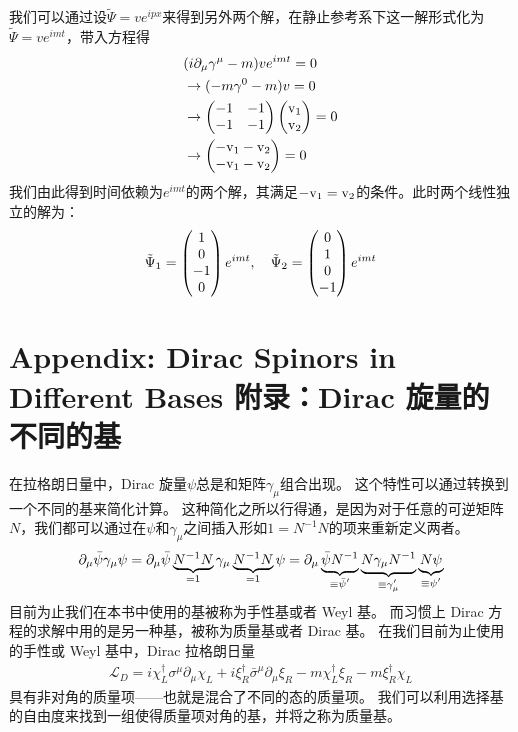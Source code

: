 我们可以通过设$\tilde \Psi =ve^{ipx}$来得到另外两个解，在静止参考系下这一解形式化为$\tilde \Psi=ve^{imt}$，带入方程得
\begin{equation}
\begin{split}
&(i\partial_\mu\gamma^\mu-m)ve^{imt}=0\\
&\to (-m\gamma^0-m)v=0\\
&\to \begin{pmatrix} -1 & -1 \\ -1 & -1 \end{pmatrix} \begin{pmatrix} \rm v_1 \\ \rm v_2 \end{pmatrix} =0\\
&\to \begin{pmatrix} \rm -v_1-v_2 \\ \rm -v_1-v_2 \end{pmatrix} =0
\end{split}
\end{equation}
我们由此得到时间依赖为$e^{imt}$的两个解，其满足$\rm -v_1=v_2$的条件。此时两个线性独立的解为：
\begin{equation}
\tilde \Psi_1=\begin{pmatrix} 1\\0\\-1\\0 \end{pmatrix} e^{imt},~~~\tilde \Psi_2=\begin{pmatrix} 0\\1\\0\\-1 \end{pmatrix} e^{imt}
\end{equation}



\section[附录：Dirac 旋量的不同的基]{Appendix: Dirac Spinors in Different Bases 附录：Dirac 旋量的不同的基}\label{sec8.10}

在拉格朗日量中，Dirac 旋量$\psi$总是和矩阵$\gamma_\mu$组合出现。
这个特性可以通过转换到一个不同的基来简化计算。
这种简化之所以行得通，是因为对于任意的可逆矩阵$N$，我们都可以通过在$\psi$和$\gamma_\mu$之间插入形如$1=N^{-1}N$的项来重新定义两者。
\begin{align}
  \partial_\mu\bar{\psi}\gamma_\mu\psi = \partial_\mu\bar{\psi}\underbrace{N^{-1}N}_{\mathclap{=1}}\gamma_\mu\underbrace{N^{-1}N}_{\mathclap{=1}}\psi = \partial_\mu\underbrace{\bar{\psi}N^{-1}}_{\mathclap{\equiv\bar{\psi}'}}\underbrace{N\gamma_\mu N^{-1}}_{\mathclap{\equiv\gamma'_\mu}}\underbrace{N\psi}_{\mathclap{\equiv\psi'}}
\end{align}
目前为止我们在本书中使用的基被称为手性基或者 Weyl 基。
而习惯上 Dirac 方程的求解中用的是另一种基，被称为质量基或者 Dirac 基。
在我们目前为止使用的手性或 Weyl 基中，Dirac 拉格朗日量
\begin{align}
  \mathcal{L}_D=i\chi_L^\dagger\sigma^\mu\partial_\mu \chi_L+i\xi_R^\dagger\bar{\sigma}^\mu\partial_\mu \xi_R-m\chi_L^\dagger\xi_R-m\xi_R^\dagger\chi_L
\end{align}
具有非对角的质量项——也就是混合了不同的态的质量项。
我们可以利用选择基的自由度来找到一组使得质量项对角的基，并将之称为质量基。

